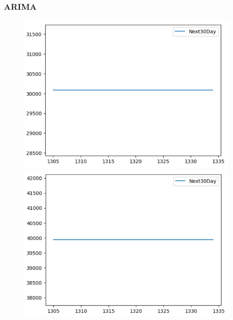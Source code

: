 \subsubsection{ARIMA}
\begin{figure}[H]
    \centering
    \begin{minipage}{0.15\textwidth}
    \centering
    \includegraphics[width=1\textwidth]{resources/chapter-5/newdata/predicted/BIDV_ARIMA_7-3_30days.png}
    \end{minipage}
    \hfill
    \begin{minipage}{0.15\textwidth}
    \centering
    \includegraphics[width=1\textwidth]{resources/chapter-5/newdata/predicted/BIDV_ARIMA_8-2_30days.png}
    \end{minipage}
    \hfill
        \begin{minipage}{0.15\textwidth}

\end{minipage}
\end{figure}
